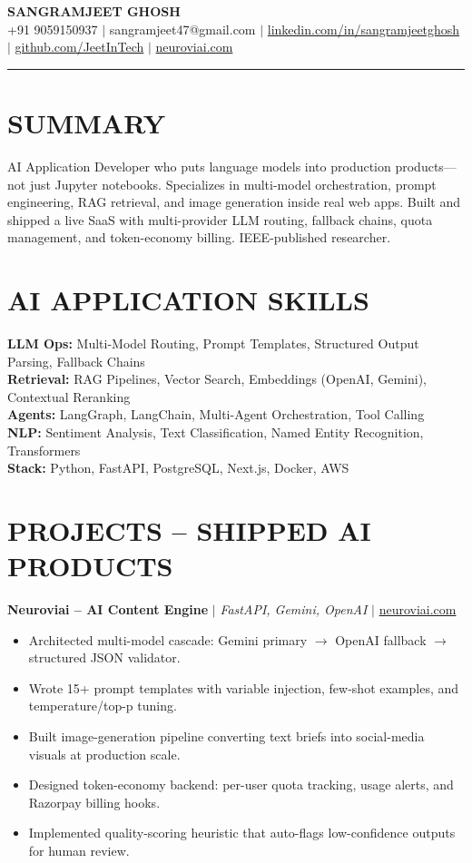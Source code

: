 \documentclass[10pt]{article}
\begin{document}
\begin{center}
{\Large \textbf{SANGRAMJEET GHOSH}} \\[2pt]
{\small +91 9059150937 $|$ sangramjeet47@gmail.com $|$
\href{https://www.linkedin.com/in/sangramjeetghosh}{linkedin.com/in/sangramjeetghosh} $|$
\href{https://github.com/JeetInTech}{github.com/JeetInTech} $|$
\href{https://neuroviai.com}{neuroviai.com}}
\end{center}

\noindent\rule{\textwidth}{0.4pt}

\section*{SUMMARY}
AI Application Developer who puts language models into production products---not just Jupyter notebooks. Specializes in multi-model orchestration, prompt engineering, RAG retrieval, and image generation inside real web apps. Built and shipped a live SaaS with multi-provider LLM routing, fallback chains, quota management, and token-economy billing. IEEE-published researcher.

\section*{AI APPLICATION SKILLS}
\textbf{LLM Ops:} Multi-Model Routing, Prompt Templates, Structured Output Parsing, Fallback Chains \\
\textbf{Retrieval:} RAG Pipelines, Vector Search, Embeddings (OpenAI, Gemini), Contextual Reranking \\
\textbf{Agents:} LangGraph, LangChain, Multi-Agent Orchestration, Tool Calling \\
\textbf{NLP:} Sentiment Analysis, Text Classification, Named Entity Recognition, Transformers \\
\textbf{Stack:} Python, FastAPI, PostgreSQL, Next.js, Docker, AWS

\section*{PROJECTS -- SHIPPED AI PRODUCTS}
\textbf{Neuroviai -- AI Content Engine} $|$ \textit{FastAPI, Gemini, OpenAI} $|$ \href{https://neuroviai.com}{neuroviai.com}
\begin{itemize}
\item Architected multi-model cascade: Gemini primary $\rightarrow$ OpenAI fallback $\rightarrow$ structured JSON validator.
\item Wrote 15+ prompt templates with variable injection, few-shot examples, and temperature/top-p tuning.
\item Built image-generation pipeline converting text briefs into social-media visuals at production scale.
\item Designed token-economy backend: per-user quota tracking, usage alerts, and Razorpay billing hooks.
\item Implemented quality-scoring heuristic that auto-flags low-confidence outputs for human review.
\end{itemize}
\end{document}
